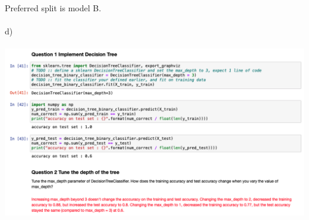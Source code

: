 \documentclass[11pt]{article}
\begin{document}
Preferred split is model B. \\ \\
 
 
d) \\ \\
\includegraphics[scale=0.33]{decision1}
\end{document}
